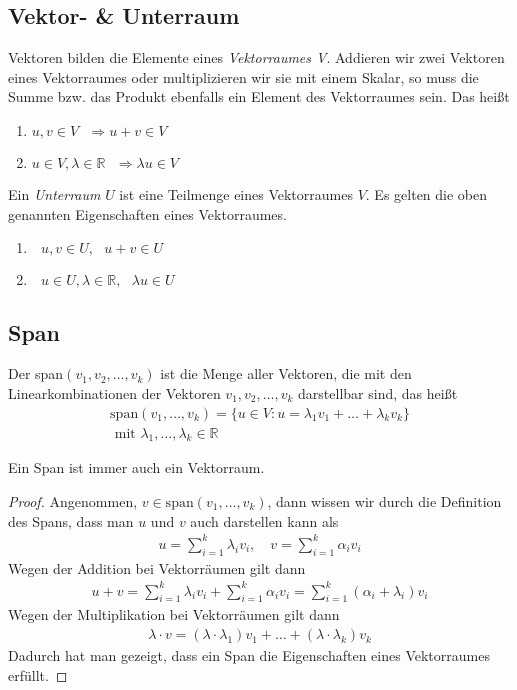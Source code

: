 \subsection{Vektor- \& Unterraum}
Vektoren bilden die Elemente eines \textit{Vektorraumes V}. Addieren wir zwei Vektoren eines Vektorraumes oder multiplizieren wir sie mit einem Skalar, so muss die Summe bzw. das Produkt ebenfalls ein Element des Vektorraumes sein. Das hei\ss t
\begin{enumerate}
\item $u, v \in V \text{ }\Rightarrow u+v \in V$
\item $u\in V, \lambda \in \mathbb{R} \text{ }\Rightarrow \lambda u \in V$
\end{enumerate}
\vspace{10pt}
Ein \textit{Unterraum} $U$ ist eine Teilmenge eines Vektorraumes $V$. Es gelten die oben genannten Eigenschaften eines Vektorraumes.
\begin{enumerate}
\item $\text{ }u, v \in U,\text{ } u+v \in U$
\item $\text{ }u \in U, \lambda \in \mathbb{R} ,\text{ }\lambda u \in U$
\end{enumerate}



\subsection{Span}
Der span$(v_1, v_2,\dots,v_k)$ ist die Menge aller Vektoren, die mit den Linearkombinationen der Vektoren $v_1, v_2, \dots, v_k$ darstellbar sind, das hei\ss t
\begin{align*}
\text{span}(v_1,\dots,v_k) = \{u \in V : u = \lambda_1v_1+\dots+\lambda_kv_k\} \\
\text{ mit } \lambda_1,\dots,\lambda_k \in \mathbb{R}
\end{align*}



\begin{theorem}
Ein Span ist immer auch ein Vektorraum.
\end{theorem}
\begin{proof} 
Angenommen, $v \in \text{span}(v_1,\dots,v_k)$,
dann wissen wir durch die Definition des Spans, dass man $u$ und $v$ auch darstellen kann als
\begin{align*}
u = \sum\limits_{i=1}^{k} \lambda_iv_i, \quad v = \sum\limits_{i=1}^{k} \alpha_iv_i
\end{align*}
Wegen der Addition bei Vektorr\"aumen gilt dann
\begin{align*}
	u + v = \sum\limits_{i=1}^{k} \lambda_iv_i + \sum\limits_{i=1}^{k} \alpha_iv_i= \sum\limits_{i=1}^{k} (\alpha_i+\lambda_i)v_i
\end{align*}
Wegen der Multiplikation bei Vektorr\"aumen gilt dann
\begin{align*}
	\lambda\cdot v = (\lambda \cdot \lambda_1) v_1+\dots+(\lambda \cdot \lambda_k)v_k
\end{align*}
Dadurch hat man gezeigt, dass ein Span die Eigenschaften eines Vektorraumes erf\"ullt.
\end{proof}



